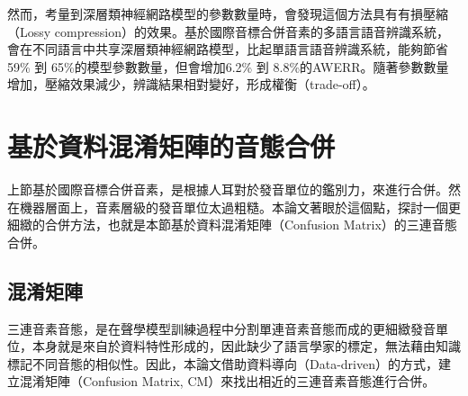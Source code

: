 然而，考量到深層類神經網路模型的參數數量時，會發現這個方法具有有損壓縮（Lossy compression）的效果。基於國際音標合併音素的多語言語音辨識系統，會在不同語言中共享深層類神經網路模型，比起單語言語音辨識系統，能夠節省59\% 到 65\%的模型參數數量，但會增加6.2\% 到 8.8\%的AWERR。隨著參數數量增加，壓縮效果減少，辨識結果相對變好，形成權衡（trade-off）。

\section{基於資料混淆矩陣的音態合併}
上節基於國際音標合併音素，是根據人耳對於發音單位的鑑別力，來進行合併。然在機器層面上，音素層級的發音單位太過粗糙。本論文著眼於這個點，探討一個更細緻的合併方法，也就是本節基於資料混淆矩陣（Confusion Matrix）的三連音態合併。


\subsection{混淆矩陣}
三連音素音態，是在聲學模型訓練過程中分割單連音素音態而成的更細緻發音單位，本身就是來自於資料特性形成的，因此缺少了語言學家的標定，無法藉由知識標記不同音態的相似性。因此，本論文借助資料導向（Data-driven）的方式，建立混淆矩陣（Confusion Matrix, CM）來找出相近的三連音素音態進行合併。

